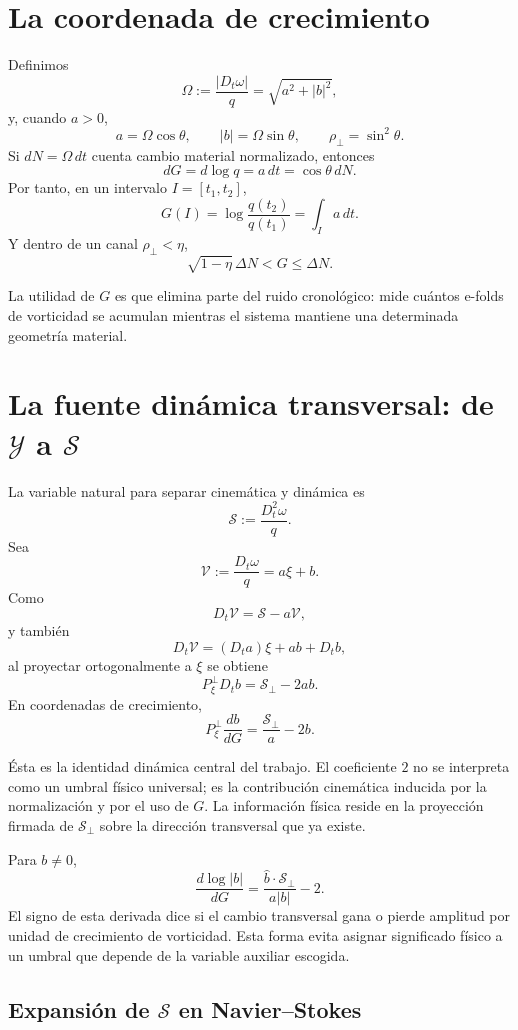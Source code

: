 \documentclass[11pt]{article}
\newcommand{\Dt}{D_t}
\newcommand{\Pperp}{P_{\xi}^{\perp}}
\newcommand{\rhoT}{\rho_{\perp}}
\newcommand{\Scal}{\mathcal S}
\begin{document}
\section{La coordenada de crecimiento}

Definimos
\[
\Omega:=\frac{|\Dt\omega|}{q}=\sqrt{a^2+|b|^2},
\]
y, cuando $a>0$,
\[
a=\Omega\cos\theta,\qquad |b|=\Omega\sin\theta,
\qquad \rhoT=\sin^2\theta.
\]
Si $dN=\Omega\,dt$ cuenta cambio material normalizado, entonces
\[
dG=d\log q=a\,dt=\cos\theta\,dN.
\]
Por tanto, en un intervalo $I=[t_1,t_2]$,
\[
\boxed{G(I)=\log\frac{q(t_2)}{q(t_1)}=\int_I a\,dt.}
\]
Y dentro de un canal $\rhoT<\eta$,
\[
\sqrt{1-\eta}\,\Delta N<G\le \Delta N.
\]

La utilidad de $G$ es que elimina parte del ruido cronológico: mide cuántos e-folds de vorticidad se acumulan mientras el sistema mantiene una determinada geometría material.

\section{La fuente dinámica transversal: de $\mathcal Y$ a $\Scal$}

La variable natural para separar cinemática y dinámica es
\[
\Scal:=\frac{\Dt^2\omega}{q}.
\]
Sea
\[
\mathcal V:=\frac{\Dt\omega}{q}=a\xi+b.
\]
Como
\[
\Dt\mathcal V=\Scal-a\mathcal V,
\]
y también
\[
\Dt\mathcal V=(\Dt a)\xi+a b+\Dt b,
\]
al proyectar ortogonalmente a $\xi$ se obtiene
\[
\boxed{\Pperp\Dt b=\Scal_\perp-2ab.}
\]
En coordenadas de crecimiento,
\[
\boxed{\Pperp\frac{db}{dG}=\frac{\Scal_\perp}{a}-2b.}
\]

Ésta es la identidad dinámica central del trabajo. El coeficiente $2$ no se interpreta como un umbral físico universal; es la contribución cinemática inducida por la normalización y por el uso de $G$. La información física reside en la proyección firmada de $\Scal_\perp$ sobre la dirección transversal que ya existe.

Para $b\neq0$,
\[
\boxed{
\frac{d\log|b|}{dG}
=\frac{\widehat b\cdot\Scal_\perp}{a|b|}-2.
}
\]
El signo de esta derivada dice si el cambio transversal gana o pierde amplitud por unidad de crecimiento de vorticidad. Esta forma evita asignar significado físico a un umbral que depende de la variable auxiliar escogida.

\subsection{Expansión de $\Scal$ en Navier--Stokes}
\end{document}

